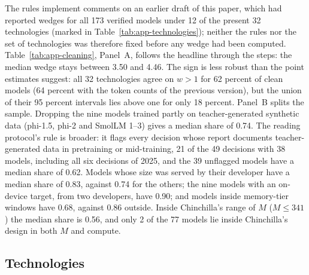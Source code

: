 The rules implement comments on an earlier draft of this paper, which had reported wedges for all 173 verified models
under 12 of the present 32 technologies (marked in Table~\ref{tab:app-technologies}); neither the rules nor the set of
technologies was therefore fixed before any wedge had been computed. Table~\ref{tab:app-cleaning}, Panel~A, follows the
headline through the steps: the median wedge stays between 3.50 and 4.46. The sign is less robust than the point
estimates suggest: all 32 technologies agree on $w>1$ for 62 percent of clean models (64 percent with the token counts of
the previous version), but the union of their 95 percent intervals lies above one for only 18 percent. Panel~B splits the
sample. Dropping the nine models trained partly on teacher-generated synthetic data (phi-1.5, phi-2 and SmolLM 1--3) gives
a median share of 0.74. The reading protocol's rule is broader: it flags every decision whose report documents
teacher-generated data in pretraining or mid-training, 21 of the 49 decisions with 38 models, including all six decisions
of 2025, and the 39 unflagged models have a median share of 0.62. Models whose size was served by their developer have a
median share of 0.83, against 0.74 for the others; the nine models with an on-device target, from two developers, have
0.90; and models inside memory-tier windows have 0.68, against 0.86 outside. Inside Chinchilla's range of $M$
($M\le341$) the median share is 0.56, and only 2 of the 77 models lie inside Chinchilla's design in both $M$ and compute.



\subsection{Technologies}\label{app:wedge-tech}

